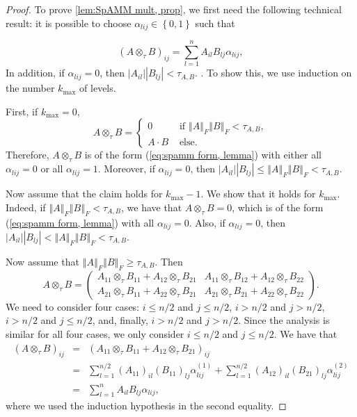\documentclass[letterpaper,twocolumn,amsmath,amsfont,amssymb,english,aps,jcp,preprintnumbers,groupaddress,nofootinbib,tightenlines,floatfix]{revtex4}
\theoremstyle{plain}
\theoremstyle{remark}
\theoremstyle{plain}
\begin{document}
\begin{proof}


To prove \ref{lem:SpAMM mult, prop}, we first need the following technical result: it is possible to choose $\alpha_{lij}\in\left\{ 0,1\right\} $ such that 

\begin{equation}
\left(A\otimes_{\tau}B\right)_{ij}=\sum_{l=1}^{n}A_{il}B_{lj}\alpha_{lij},\label{eq:spamm form, lemma}
\end{equation}
In addition, if $\alpha_{lij}=0$, then \textup{$\left|A_{il}\right|\left|B_{lj}\right|<\tau_{A,B}$. }. To show this, we use 
induction on the number $k_{\max}$ of levels. 

First, if $k_{\max}=0$,
\[
A\otimes_{\tau}B=\begin{cases}
0 & \,\,\text{if}\,\,\left\Vert A\right\Vert _{F}\left\Vert B\right\Vert _{F}<\tau_{A,B},\\
A\cdot B & \,\,\text{else}.
\end{cases}
\]
Therefore, $A\otimes_{\tau}B$ is of the form (\ref{eq:spamm form, lemma})
with either all $\alpha_{lij}=0$ or all $\alpha_{lij}=1$. Moreover,
if $\alpha_{lij}=0$, then $\left|A_{il}\right|\left|B_{lj}\right|\leq\left\Vert A\right\Vert _{F}\left\Vert B\right\Vert _{F}<\tau_{A,B}$. 

Now assume that the claim holds for $k_{\max}-1$. We show that it
holds for $k_{\max}$. Indeed, if $\left\Vert A\right\Vert _{F}\left\Vert B\right\Vert _{F}<\tau_{A,B}$,
we have that $A\otimes_{\tau}B=0$, which is of the form (\ref{eq:spamm form, lemma})
with all $\alpha_{lij}=0$. Also, if $\alpha_{lij}=0$, then $\left|A_{il}\right|\left|B_{lj}\right|<\left\Vert A\right\Vert _{F}\left\Vert B\right\Vert _{F}<\tau_{A,B}$.

Now assume that $\left\Vert A\right\Vert _{F}\left\Vert B\right\Vert _{F}\geq\tau_{A,B}$.
Then
\[
A\otimes_{\tau}B=\left(\begin{array}{cc}
A_{11}\otimes_{\tau}B_{11}+A_{12}\otimes_{\tau}B_{21} & A_{11}\otimes_{\tau}B_{12}+A_{12}\otimes_{\tau}B_{22}\\
A_{21}\otimes_{\tau}B_{11}+A_{22}\otimes_{\tau}B_{21} & A_{21}\otimes_{\tau}B_{21}+A_{22}\otimes_{\tau}B_{22}
\end{array}\right).
\]
We need to consider four cases: $i\leq n/2$ and $j\leq n/2$, $i>n/2$
and $j>n/2$, $i>n/2$ and $j\leq n/2$, and, finally, $i>n/2$ and
$j>n/2$. Since the analysis is similar for all four cases, we only
consider $i\leq n/2$ and $j\leq n/2$. We have that 
\begin{eqnarray*}
\left(A\otimes_{\tau}B\right)_{ij} & = & \left(A_{11}\otimes_{\tau}B_{11}+A_{12}\otimes_{\tau}B_{21}\right)_{ij}\\
 & = & \sum_{l=1}^{n/2}\left(A_{11}\right)_{il}\left(B_{11}\right)_{lj}\alpha_{lij}^{(1)}+\sum_{l=1}^{n/2}\left(A_{12}\right)_{il}\left(B_{21}\right)_{lj}\alpha_{lij}^{(2)}\\
 & = & \sum_{l=1}^{n}A_{il}B_{lj}\alpha_{lij},
\end{eqnarray*}
where we used the induction hypothesis in the second equality.


\end{proof}
\end{document}
